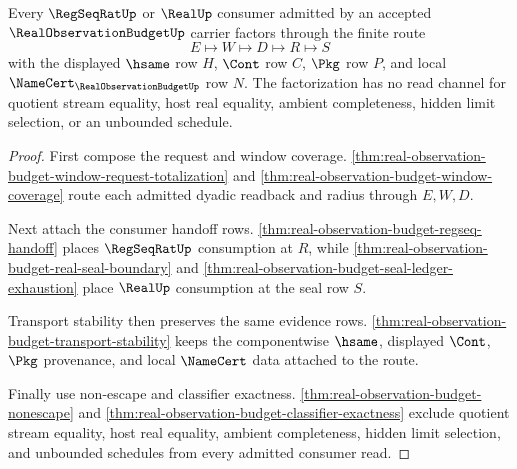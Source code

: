 \begin{theorem}
\label{thm:real-observation-budget-regseq-real-consumer-factorization}
Every $\RegSeqRatUp$ or $\RealUp$ consumer admitted by an accepted $\RealObservationBudgetUp$ carrier factors through the finite route
$$
E \longmapsto W \longmapsto D \longmapsto R \longmapsto S
$$
with the displayed $\hsame$ row $H$, $\Cont$ row $C$, $\Pkg$ row $P$, and local $\NameCert_{\RealObservationBudgetUp}$ row $N$. The factorization has no read channel for quotient stream equality, host real equality, ambient completeness, hidden limit selection, or an unbounded schedule.
\end{theorem}
\begin{proof}
First compose the request and window coverage. \autoref{thm:real-observation-budget-window-request-totalization} and \autoref{thm:real-observation-budget-window-coverage} route each admitted dyadic readback and radius through $E,W,D$.

Next attach the consumer handoff rows. \autoref{thm:real-observation-budget-regseq-handoff} places $\RegSeqRatUp$ consumption at $R$, while \autoref{thm:real-observation-budget-real-seal-boundary} and \autoref{thm:real-observation-budget-seal-ledger-exhaustion} place $\RealUp$ consumption at the seal row $S$.

Transport stability then preserves the same evidence rows. \autoref{thm:real-observation-budget-transport-stability} keeps the componentwise $\hsame$, displayed $\Cont$, $\Pkg$ provenance, and local $\NameCert$ data attached to the route.

Finally use non-escape and classifier exactness. \autoref{thm:real-observation-budget-nonescape} and \autoref{thm:real-observation-budget-classifier-exactness} exclude quotient stream equality, host real equality, ambient completeness, hidden limit selection, and unbounded schedules from every admitted consumer read.
\end{proof}

